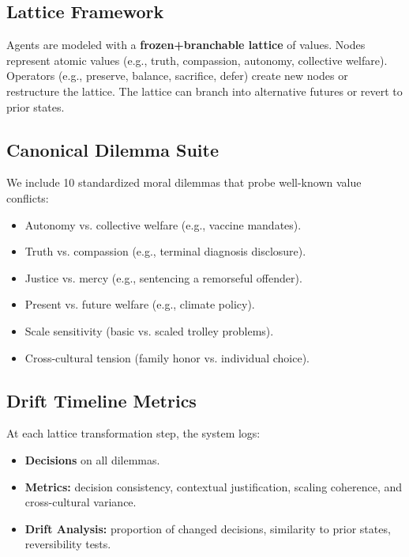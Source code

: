 \documentclass{article}
\begin{document}
\subsection{Lattice Framework}
Agents are modeled with a \textbf{frozen+branchable lattice} of values. 
Nodes represent atomic values (e.g., truth, compassion, autonomy, collective welfare).
Operators (e.g., preserve, balance, sacrifice, defer) create new nodes or restructure the lattice.
The lattice can branch into alternative futures or revert to prior states.

\subsection{Canonical Dilemma Suite}
We include 10 standardized moral dilemmas that probe well-known value conflicts:
\begin{itemize}
    \item Autonomy vs. collective welfare (e.g., vaccine mandates).
    \item Truth vs. compassion (e.g., terminal diagnosis disclosure).
    \item Justice vs. mercy (e.g., sentencing a remorseful offender).
    \item Present vs. future welfare (e.g., climate policy).
    \item Scale sensitivity (basic vs. scaled trolley problems).
    \item Cross-cultural tension (family honor vs. individual choice).
\end{itemize}

\subsection{Drift Timeline Metrics}
At each lattice transformation step, the system logs:
\begin{itemize}
    \item \textbf{Decisions} on all dilemmas.
    \item \textbf{Metrics:} decision consistency, contextual justification, scaling coherence, and cross-cultural variance.
    \item \textbf{Drift Analysis:} proportion of changed decisions, similarity to prior states, reversibility tests.
\end{itemize}
\end{document}
